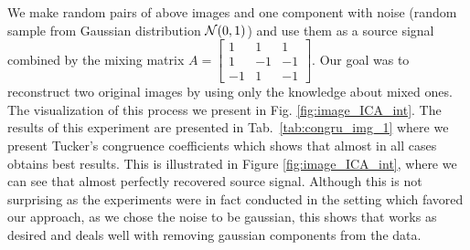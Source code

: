 We make random pairs of above images and one component with noise (random sample from Gaussian distribution $\mathcal{N}(0,1)$) and use them as a source signal combined by the mixing matrix $A = \begin{bmatrix} 1 & 1 & 1  \\ 1 & -1 & -1 \\ -1 & 1 & -1  \end{bmatrix} $. Our goal was to reconstruct two original images by using only the knowledge about mixed ones. The visualization of this process we present in Fig. \ref{fig:image_ICA_int}. The results of this experiment are presented in Tab.~\ref{tab:congru_img_1} where we present Tucker's congruence coefficients which shows that almost in all cases \ICA{} obtains best results. This is illustrated in Figure \ref{fig:image_ICA_int}, where we can see that \ICA {} almost perfectly recovered source signal. 
Although this is not surprising as the experiments were in fact conducted in the setting which favored our approach, as we chose the noise to be gaussian, this shows that \ICA{} works as desired and deals well with removing gaussian
components from the data. 



